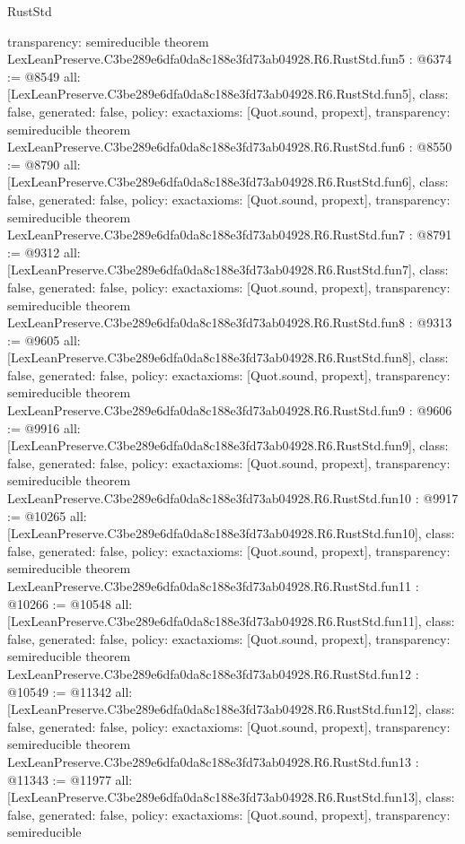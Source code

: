 \begin{lexlean}{RustStd}
\begin{coremodule}
{  transparency: semireducible
}
theorem LexLeanPreserve.C3be289e6dfa0da8c188e3fd73ab04928.R6.RustStd.fun5 : @6374 := @8549 {
  all: [LexLeanPreserve.C3be289e6dfa0da8c188e3fd73ab04928.R6.RustStd.fun5],
  class: false,
  generated: false,
  policy: exact{axioms: [Quot.sound, propext]},
  transparency: semireducible
}
theorem LexLeanPreserve.C3be289e6dfa0da8c188e3fd73ab04928.R6.RustStd.fun6 : @8550 := @8790 {
  all: [LexLeanPreserve.C3be289e6dfa0da8c188e3fd73ab04928.R6.RustStd.fun6],
  class: false,
  generated: false,
  policy: exact{axioms: [Quot.sound, propext]},
  transparency: semireducible
}
theorem LexLeanPreserve.C3be289e6dfa0da8c188e3fd73ab04928.R6.RustStd.fun7 : @8791 := @9312 {
  all: [LexLeanPreserve.C3be289e6dfa0da8c188e3fd73ab04928.R6.RustStd.fun7],
  class: false,
  generated: false,
  policy: exact{axioms: [Quot.sound, propext]},
  transparency: semireducible
}
theorem LexLeanPreserve.C3be289e6dfa0da8c188e3fd73ab04928.R6.RustStd.fun8 : @9313 := @9605 {
  all: [LexLeanPreserve.C3be289e6dfa0da8c188e3fd73ab04928.R6.RustStd.fun8],
  class: false,
  generated: false,
  policy: exact{axioms: [Quot.sound, propext]},
  transparency: semireducible
}
theorem LexLeanPreserve.C3be289e6dfa0da8c188e3fd73ab04928.R6.RustStd.fun9 : @9606 := @9916 {
  all: [LexLeanPreserve.C3be289e6dfa0da8c188e3fd73ab04928.R6.RustStd.fun9],
  class: false,
  generated: false,
  policy: exact{axioms: [Quot.sound, propext]},
  transparency: semireducible
}
theorem LexLeanPreserve.C3be289e6dfa0da8c188e3fd73ab04928.R6.RustStd.fun10 : @9917 := @10265 {
  all: [LexLeanPreserve.C3be289e6dfa0da8c188e3fd73ab04928.R6.RustStd.fun10],
  class: false,
  generated: false,
  policy: exact{axioms: [Quot.sound, propext]},
  transparency: semireducible
}
theorem LexLeanPreserve.C3be289e6dfa0da8c188e3fd73ab04928.R6.RustStd.fun11 : @10266 := @10548 {
  all: [LexLeanPreserve.C3be289e6dfa0da8c188e3fd73ab04928.R6.RustStd.fun11],
  class: false,
  generated: false,
  policy: exact{axioms: [Quot.sound, propext]},
  transparency: semireducible
}
theorem LexLeanPreserve.C3be289e6dfa0da8c188e3fd73ab04928.R6.RustStd.fun12 : @10549 := @11342 {
  all: [LexLeanPreserve.C3be289e6dfa0da8c188e3fd73ab04928.R6.RustStd.fun12],
  class: false,
  generated: false,
  policy: exact{axioms: [Quot.sound, propext]},
  transparency: semireducible
}
theorem LexLeanPreserve.C3be289e6dfa0da8c188e3fd73ab04928.R6.RustStd.fun13 : @11343 := @11977 {
  all: [LexLeanPreserve.C3be289e6dfa0da8c188e3fd73ab04928.R6.RustStd.fun13],
  class: false,
  generated: false,
  policy: exact{axioms: [Quot.sound, propext]},
  transparency: semireducible
}
\end{coremodule}
\end{lexlean}
